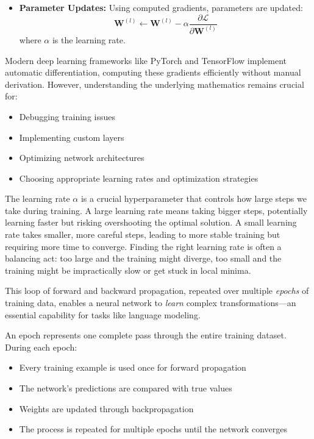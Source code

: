 \begin{itemize}
\begin{itemize}
        \item \textbf{Parameter Updates:} Using computed gradients, parameters are updated:
        \begin{equation}
            \mathbf{W}^{(l)} \leftarrow \mathbf{W}^{(l)} - \alpha \frac{\partial \mathcal{L}}{\partial \mathbf{W}^{(l)}}
        \end{equation}
        where $\alpha$ is the learning rate.
    \end{itemize}

    Modern deep learning frameworks like PyTorch and TensorFlow implement automatic differentiation, computing these gradients efficiently without manual derivation. However, understanding the underlying mathematics remains crucial for:
    \begin{itemize}
        \item Debugging training issues
        \item Implementing custom layers
        \item Optimizing network architectures
        \item Choosing appropriate learning rates and optimization strategies
    \end{itemize}


    The learning rate $\alpha$ is a crucial hyperparameter that controls how large steps we take during training. A large learning rate means taking bigger steps, potentially learning faster but risking overshooting the optimal solution. A small learning rate takes smaller, more careful steps, leading to more stable training but requiring more time to converge. Finding the right learning rate is often a balancing act: too large and the training might diverge, too small and the training might be impractically slow or get stuck in local minima.
\end{itemize}


This loop of forward and backward propagation, repeated over multiple \emph{epochs} of training data, enables a neural network to \emph{learn} complex transformations—an essential capability for tasks like language modeling.

\noindent
An epoch represents one complete pass through the entire training dataset. During each epoch:
\begin{itemize}
    \item Every training example is used once for forward propagation
    \item The network's predictions are compared with true values
    \item Weights are updated through backpropagation
    \item The process is repeated for multiple epochs until the network converges
\end{itemize}

